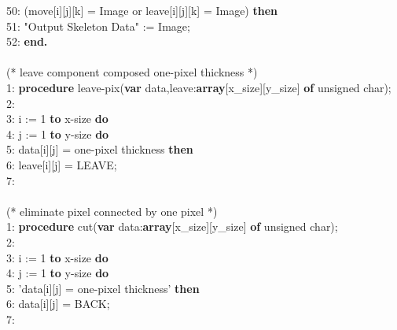 \documentclass[a4paper,10pt]{jarticle}
\begin{document}
50: \hspace{1.5cm}{\bfseries if} (move[i][j][k] = Image or leave[i][j][k] = Image) {\bfseries then}\\
51: \hspace{2cm}"Output Skeleton Data" := Image;\\
52: {\bfseries end.}\\
\\
(* leave component composed one-pixel thickness *)\\
1: {\bfseries procedure} leave-pix({\bfseries var} data,leave:{\bfseries array}[x\_size][y\_size] {\bfseries of} unsigned char);\\
2: \hspace{0cm}{\bfseries begin}\\
3: \hspace{0.5cm}{\bfseries for} i := 1 {\bfseries to} x-size {\bfseries do}\\
4: \hspace{1cm}{\bfseries for} j := 1 {\bfseries to} y-size {\bfseries do}\\
5: \hspace{2cm}{\bfseries if} data[i][j] = one-pixel thickness {\bfseries then}\\
6: \hspace{2.5cm}leave[i][j] = LEAVE;\\
7: \hspace{0cm}{\bfseries end;}\\
\\
(* eliminate pixel connected by one pixel *)\\
1: {\bfseries procedure} cut({\bfseries var} data:{\bfseries array}[x\_size][y\_size] {\bfseries of} unsigned char);\\
2: \hspace{0cm}{\bfseries begin}\\
3: \hspace{0.5cm}{\bfseries for} i := 1 {\bfseries to} x-size {\bfseries do}\\
4: \hspace{1cm}{\bfseries for} j := 1 {\bfseries to} y-size {\bfseries do}\\
5: \hspace{2cm}{\bfseries if} 'data[i][j] = one-pixel thickness' {\bfseries then}\\
6: \hspace{2.5cm}data[i][j] = BACK;\\
7: \hspace{0cm}{\bfseries end;}\\
\end{document}
